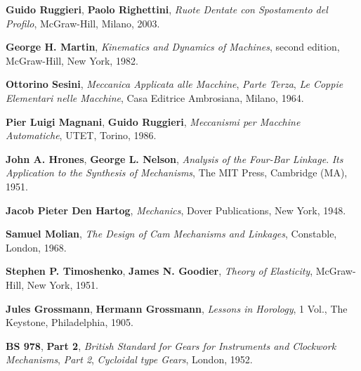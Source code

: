\begin{thebibliography}{99}
 {\bfseries Guido Ruggieri},
	{\bfseries Paolo Righettini},
        {\em Ruote Dentate con Spostamento del Profilo},
      	McGraw-Hill, Milano, 2003.

 {\bfseries George H. Martin},
        {\em Kinematics and Dynamics of Machines}, second edition,
        McGraw-Hill, New York, 1982.

 {\bfseries Ottorino Sesini},
        {\em Meccanica Applicata alle Macchine},
        {\em Parte Terza}, {\em Le Coppie Elementari nelle Macchine},
        Casa Editrice Ambrosiana, Milano, 1964.

 {\bfseries Pier Luigi Magnani},
	{\bfseries Guido Ruggieri},
        {\em Meccanismi per Macchine Automatiche},
        UTET, Torino, 1986.

 {\bfseries John A. Hrones},
	{\bfseries George L. Nelson},
        {\em Analysis of the Four-Bar Linkage}. {\em Its Application to
        the Synthesis of Mechanisms},
        The MIT Press, Cambridge (MA), 1951.

 {\bfseries  Jacob Pieter Den Hartog},
        {\em Mechanics},
        Dover Publications, New York, 1948.
 
 {\bfseries Samuel Molian},
        {\em The Design of Cam Mechanisms and Linkages},
        Constable, London, 1968.

 {\bfseries Stephen P. Timoshenko}, {\bfseries James N. Goodier},
        {\em Theory of Elasticity},
        McGraw-Hill, New York, 1951.

 {\bfseries Jules Grossmann},
	{\bfseries Hermann Grossmann},
        {\em Lessons in Horology}, 1 Vol.,
        The Keystone, Philadelphia, 1905.

 {\bfseries BS 978}, {\bfseries Part 2},
	{\em British Standard for Gears for Instruments and Clockwork
	Mechanisms}, {\em Part 2}, {\em Cycloidal type Gears},
	London, 1952.

\end{thebibliography}

\endinput
